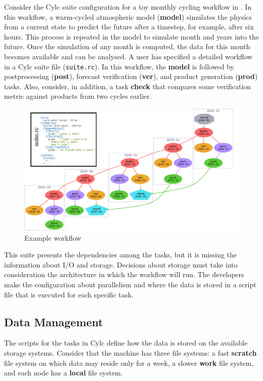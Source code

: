 \documentclass[a4paper]{article}
\begin{document}
Consider the Cylc suite configuration for a toy monthly cycling workflow in  \cite{8675433}.
In this workflow, a warm-cycled atmospheric model (\textbf{model}) simulates the physics from a current state to predict the future after a timestep, for example, after six hours.
This process is repeated in the model to simulate month and years into the future.
Once the simulation of any month is computed, the data for this month becomes available and can be analysed.
A user has specified a detailed workflow in a Cylc suite file (\texttt{suite.rc}).
In this workflow, the \textbf{model} is followed by postprocessing (\textbf{post}), forecast verification (\textbf{ver}), and product generation (\textbf{prod}) tasks.
Also, consider, in addition, a task \textbf{check} that compares some verification metric against products from two cycles earlier.

\begin{figure}[H]
  \centering
  \includegraphics[width=0.9\columnwidth]{cylc1}
  \caption{Example workflow}
  \label{fig:cylc}
\end{figure}

This suite presents the dependencies among the tasks, but it is missing the information about I/O and storage.
Decisions about storage must take into consideration the architecture in which the workflow will run.
The developers make the configuration about parallelism and where the data is stored in a script file that is executed for each specific task.

\subsection{Data Management}
\label{sec:datamanagement}

The scripts for the tasks in Cylc define how the data is stored on the available storage systems.
Consider that the machine has three file systems: a fast \textbf{scratch} file system on which data may reside only for a week, a slower \textbf{work} file system, and each node has a \textbf{local} file system.
\end{document}
